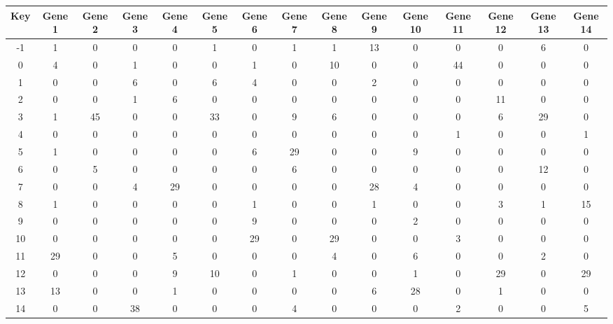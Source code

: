 \begin{tabular}{|c|c|c|c|c|c|c|c|c|c|c|c|c|c|c|}
\hline
Key & Gene 1 & Gene 2 & Gene 3 & Gene 4 & Gene 5 & Gene 6 & Gene 7 & Gene 8 & Gene 9 & Gene 10 & Gene 11 & Gene 12 & Gene 13 & Gene 14 \\
\hline
-1 & 1 & 0 & 0 & 0 & 1 & 0 & 1 & 1 & 13 & 0 & 0 & 0 & 6 & 0 \\
0 & 4 & 0 & 1 & 0 & 0 & 1 & 0 & 10 & 0 & 0 & 44 & 0 & 0 & 0 \\
1 & 0 & 0 & 6 & 0 & 6 & 4 & 0 & 0 & 2 & 0 & 0 & 0 & 0 & 0 \\
2 & 0 & 0 & 1 & 6 & 0 & 0 & 0 & 0 & 0 & 0 & 0 & 11 & 0 & 0 \\
3 & 1 & 45 & 0 & 0 & 33 & 0 & 9 & 6 & 0 & 0 & 0 & 6 & 29 & 0 \\
4 & 0 & 0 & 0 & 0 & 0 & 0 & 0 & 0 & 0 & 0 & 1 & 0 & 0 & 1 \\
5 & 1 & 0 & 0 & 0 & 0 & 6 & 29 & 0 & 0 & 9 & 0 & 0 & 0 & 0 \\
6 & 0 & 5 & 0 & 0 & 0 & 0 & 6 & 0 & 0 & 0 & 0 & 0 & 12 & 0 \\
7 & 0 & 0 & 4 & 29 & 0 & 0 & 0 & 0 & 28 & 4 & 0 & 0 & 0 & 0 \\
8 & 1 & 0 & 0 & 0 & 0 & 1 & 0 & 0 & 1 & 0 & 0 & 3 & 1 & 15 \\
9 & 0 & 0 & 0 & 0 & 0 & 9 & 0 & 0 & 0 & 2 & 0 & 0 & 0 & 0 \\
10 & 0 & 0 & 0 & 0 & 0 & 29 & 0 & 29 & 0 & 0 & 3 & 0 & 0 & 0 \\
11 & 29 & 0 & 0 & 5 & 0 & 0 & 0 & 4 & 0 & 6 & 0 & 0 & 2 & 0 \\
12 & 0 & 0 & 0 & 9 & 10 & 0 & 1 & 0 & 0 & 1 & 0 & 29 & 0 & 29 \\
13 & 13 & 0 & 0 & 1 & 0 & 0 & 0 & 0 & 6 & 28 & 0 & 1 & 0 & 0 \\
14 & 0 & 0 & 38 & 0 & 0 & 0 & 4 & 0 & 0 & 0 & 2 & 0 & 0 & 5 \\
\hline
\end{tabular}